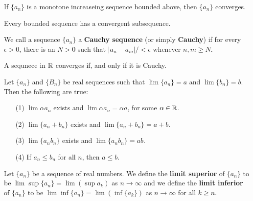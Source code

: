 \begin{lemma}\label{lemma_4.26}
    If $\{a_n\}$ is a monotone increaseing sequence bounded above, then
    $\{a_n\}$ converges.
\end{lemma}

\begin{theorem}\label{thm_4.27}
    Every bounded sequence has a convergent subsequence.
\end{theorem}

\begin{definition}
    We call a sequence $\{a_n\}$ a \textbf{Cauchy sequence} (or simply
    \textbf{Cauchy}) if for every $\epsilon>0$, there is an  $N>0$ such that
    $|a_n-a_m|/<\epsilon$ whenever  $n,m \geq N$.
\end{definition}

\begin{theorem}\label{thm_4.28}
    A sequnece in $\mathbb{R}$ converges if, and only if it is Cauchy.
\end{theorem}

\begin{theorem}\label{thm_4.29}
    Let $\{a_n\}$ and $\{B_n\}$ be real sequences such that $\lim{\{a_n\}}=a$
    and $\lim{\{b_n\}}=b$. Then the following are true:
    \begin{enumerate}
        \item[(1)] $\lim{\alpha a_n}$ exists and $\lim{\alpha a_n}=\alpha a$,
            for some $\alpha \in \mathbb{R}$.

        \item[(2)] $\lim{\{a_n+b_n\}}$ exists and $\lim{\{a_n+b_n\}}=a+b$.

        \item[(3)] $\lim{\{a_nb_n\}}$ exists and $\lim{\{a_nb_n\}}=ab$.

        \item[(4)] If $a_n \leq b_n$ for all  $n$, then  $a \leq b$.
    \end{enumerate}
\end{theorem}

\begin{definition}
    Let $\{a_n\}$ be a sequence of real numbers. We define the \textbf{limit
    superior} of  $\{a_n\}$ to be $\lim\sup{\{a_n\}}=\lim{(\sup{a_k})}$ as $n
    \xrightarrow{} \infty$ and we define the \textbf{limit inferior} of
    $\{a_n\}$ to be $\lim\inf{\{a_n\}}=\lim{(\inf{\{a_k\}})}$ as $n \xrightarrow{}
    \infty$ for all $k \geq n$.
\end{definition}

